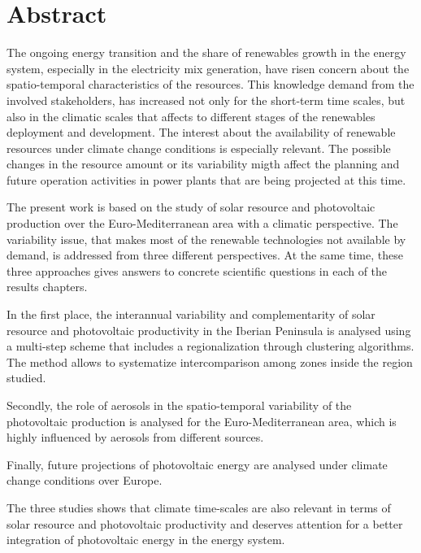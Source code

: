 \chapter*{Abstract\label{cha:abstract}}
  The ongoing energy transition and the share of renewables growth in the energy system, especially in the electricity mix generation, have risen concern about the spatio-temporal characteristics of the resources. This knowledge demand from the involved stakeholders, has increased not only for the short-term time scales, but also in the climatic scales that affects to different stages of the renewables deployment and development. The interest about the availability of renewable resources under climate change conditions is especially relevant. The possible changes in the resource amount or its variability migth affect the planning and future operation activities in power plants that are being projected at this time. 

The present work is based on the study of solar resource and photovoltaic production over the Euro-Mediterranean area with a climatic perspective. The variability issue, that makes most of the renewable technologies not available by demand, is addressed from three different perspectives. At the same time, these three approaches gives answers to concrete scientific questions in each of the results chapters.

In the first place, the interannual variability and complementarity of solar resource and photovoltaic productivity in the Iberian Peninsula is analysed using a multi-step scheme that includes a regionalization through clustering algorithms. The method allows to systematize intercomparison among zones inside the region studied.

Secondly, the role of aerosols in the spatio-temporal variability of the photovoltaic production is analysed for the Euro-Mediterranean area, which is highly influenced by aerosols from different sources.

Finally, future projections of photovoltaic energy are analysed under climate change conditions over Europe.

The three studies shows that climate time-scales are also relevant in terms of solar resource and photovoltaic productivity and deserves attention for a better integration of photovoltaic energy in the energy system.

